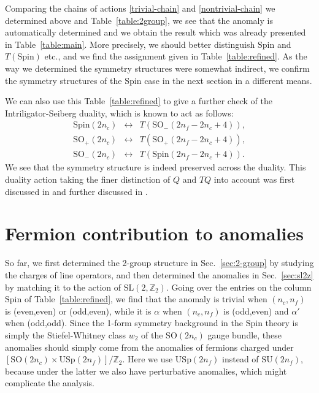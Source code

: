 \documentclass[12pt]{article}
\numberwithin{equation}{section}
\def\bZ{\mathbb{Z}}
\def\SU{\mathrm{SU}}
\def\SO{\mathrm{SO}}
\def\USp{\mathrm{USp}}
\def\Spin{\mathrm{Spin}}
\def\SL{\mathrm{SL}}
\begin{document}
Comparing the chains of actions \eqref{trivial-chain} and \eqref{nontrivial-chain} we determined above 
and Table~\ref{table:2group},
we see that the anomaly is automatically determined and 
we obtain the result which was already presented in Table~\ref{table:main}.
More precisely, we should better distinguish $\Spin$ and $T(\Spin)$ etc.,
and we find the assignment given in Table~\ref{table:refined}.
As the way we determined the symmetry structures were somewhat indirect,
we confirm the symmetry structures of the $\Spin$ case in the next section
in a different means.

We can also use this Table~\ref{table:refined}
to give a further check of the Intriligator-Seiberg duality,
which is known to act as follows:
\begin{equation}
\renewcommand{\arraystretch}{1.1}
\begin{array}{ccc}
	\Spin(2n_c) & \leftrightarrow & T(\SO_-(2n_f-2n_c+4)),\\
	\SO_+(2n_c) & \leftrightarrow & T(\SO_+(2n_f-2n_c+4)),\\ 
	\SO_-(2n_c) & \leftrightarrow & T(\Spin(2n_f-2n_c+4)).
\end{array}
\end{equation} 
We see that the symmetry structure is indeed preserved across the duality.
This duality action  taking  the finer distinction of $Q$ and $TQ$ into account was
first discussed in \cite[Sec.~6]{Gaiotto:2014kfa} and further discussed in \cite{Bhardwaj:2020ymp}.


\section{Fermion contribution to anomalies}
\label{sec:fermion}
So far, we first determined the 2-group structure in Sec.~\ref{sec:2-group} by studying the charges of line operators,
and then determined the anomalies in Sec.~\ref{sec:sl2z} by matching it to the action of $\SL(2,\bZ_2)$.
Going over  the entries on the column $\Spin$ of Table~\ref{table:refined},
we find that the anomaly is trivial when $(n_c,n_f)$ is (even,even) or (odd,even),
while it is $\alpha$ when $(n_c,n_f)$ is (odd,even) and $\alpha'$ when (odd,odd).
Since the 1-form symmetry background in the $\Spin$ theory is simply the Stiefel-Whitney class $w_2$ of the $\SO(2n_c)$ gauge bundle, 
these anomalies should simply come from the anomalies of fermions charged under $[\SO(2n_c)\times \USp(2n_f)]/\bZ_2$.
Here we use $\USp(2n_f)$ instead of $\SU(2n_f)$, because under the latter we also have perturbative anomalies, which might complicate the analysis.
\end{document}
